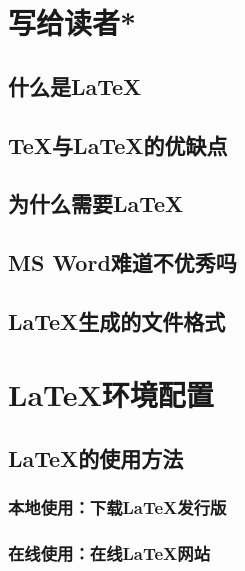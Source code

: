 \documentclass[twoside]{ctexart} %
\begin{document}
\section{写给读者*}
    \subsection{什么是\LaTeX}
    \subsection{\TeX 与\LaTeX 的优缺点}
    \subsection{为什么需要\LaTeX}
    \subsection{MS Word难道不优秀吗}
    \subsection{\LaTeX 生成的文件格式}

\section{\LaTeX 环境配置}
    \subsection{\LaTeX 的使用方法}
        \subsubsection{本地使用：下载\LaTeX 发行版}
        \subsubsection{在线使用：在线\LaTeX 网站}
\end{document}
